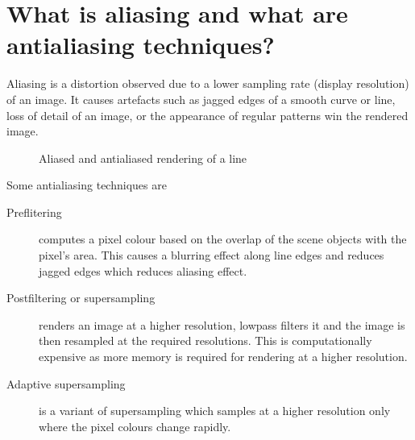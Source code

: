 \documentclass[a4paper,14pt,english,crop=false]{standalone}
\begin{document}
\section{What is aliasing and what are antialiasing techniques?}
Aliasing is a distortion observed due to a lower sampling rate (display
resolution) of an image. It causes artefacts such as jagged edges of a smooth
curve or line, loss of detail of an image, or the appearance of regular patterns
win the rendered image.
\begin{figure}[h!]
  \centering
  \subfloat[Aliased]{}\qquad
  \subfloat[Antialiased]{}\qquad
  \caption{Aliased and antialiased rendering of a line}
\end{figure}

Some antialiasing techniques are
\begin{description}
  \item [Preflitering] {computes a pixel colour based on the overlap of the
      scene objects with the pixel's area. This causes a blurring effect along
      line edges and reduces jagged edges which reduces aliasing effect.}
  \item [Postfiltering or supersampling] {renders an image at a higher
      resolution, lowpass filters it and the image is then resampled at the
      required resolutions.  This is computationally expensive as more memory is
      required for rendering at a higher resolution.}
  \item [Adaptive supersampling] {is a variant of supersampling which samples at
      a higher resolution only where the pixel colours change rapidly.}
\end{description}
\end{document}
